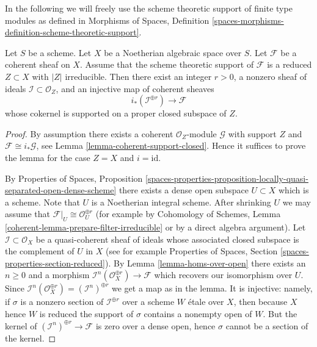 \noindent
In the following we will freely use the scheme theoretic support of
finite type modules as defined in Morphisms of Spaces, Definition
\ref{spaces-morphisms-definition-scheme-theoretic-support}.

\begin{lemma}
\label{lemma-prepare-filter-irreducible}
Let $S$ be a scheme. Let $X$ be a Noetherian algebraic space over $S$.
Let $\mathcal{F}$ be a coherent sheaf on $X$. Assume that the scheme
theoretic support of $\mathcal{F}$ is a reduced $Z \subset X$ with
$|Z|$ irreducible. Then there exist an integer $r > 0$, a nonzero
sheaf of ideals $\mathcal{I} \subset \mathcal{O}_Z$, and an injective
map of coherent sheaves
$$
i_*\left(\mathcal{I}^{\oplus r}\right) \to \mathcal{F}
$$
whose cokernel is supported on a proper closed subspace of $Z$.
\end{lemma}

\begin{proof}
By assumption there exists a coherent $\mathcal{O}_Z$-module
$\mathcal{G}$ with support $Z$ and $\mathcal{F} \cong i_*\mathcal{G}$, see
Lemma \ref{lemma-coherent-support-closed}. Hence it suffices to prove the
lemma for the case $Z = X$ and $i = \text{id}$.

\medskip\noindent
By Properties of Spaces, Proposition
\ref{spaces-properties-proposition-locally-quasi-separated-open-dense-scheme}
there exists a dense open subspace $U \subset X$ which is a scheme. Note that
$U$ is a Noetherian integral scheme. After shrinking $U$ we may assume
that $\mathcal{F}|_U \cong \mathcal{O}_U^{\oplus r}$ (for example by
Cohomology of Schemes, Lemma \ref{coherent-lemma-prepare-filter-irreducible}
or by a direct algebra argument). Let $\mathcal{I} \subset \mathcal{O}_X$
be a quasi-coherent sheaf of ideals whose associated closed subspace
is the complement of $U$ in $X$ (see for example
Properties of Spaces, Section \ref{spaces-properties-section-reduced}). 
By Lemma \ref{lemma-homs-over-open} there exists an $n \geq 0$ and a
morphism $\mathcal{I}^n(\mathcal{O}_X^{\oplus r}) \to \mathcal{F}$
which recovers our isomorphism over $U$. Since
$\mathcal{I}^n(\mathcal{O}_X^{\oplus r}) = (\mathcal{I}^n)^{\oplus r}$
we get a map as in the lemma. It is injective: namely, if $\sigma$ is
a nonzero section of $\mathcal{I}^{\oplus r}$ over a scheme $W$ \'etale
over $X$, then because $X$ hence $W$ is reduced the support of $\sigma$
contains a nonempty open of $W$. But the kernel of
$(\mathcal{I}^n)^{\oplus r} \to \mathcal{F}$ is zero
over a dense open, hence $\sigma$ cannot be a section of the kernel.
\end{proof}

